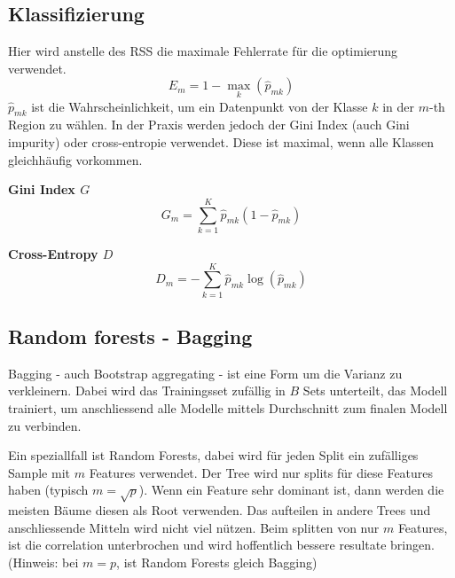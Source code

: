 \subsection{Klassifizierung}
Hier wird anstelle des RSS die maximale Fehlerrate für die optimierung verwendet.
\[
E_m = 1-\max_k(\hat{p}_{mk})
\]
$\hat{p}_{mk}$ ist die Wahrscheinlichkeit, um ein Datenpunkt von der Klasse $k$ in der $m$-th Region zu wählen. In der Praxis werden jedoch der Gini Index (auch Gini impurity) oder cross-entropie verwendet. Diese ist maximal, wenn alle Klassen gleichhäufig vorkommen.


\textbf{Gini Index $G$}
\[
G_m = \sum_{k=1}^{K}\hat{p}_{mk}(1-\hat{p}_{mk})
\]

\textbf{Cross-Entropy $D$}
\[
D_m = -\sum_{k=1}^{K}\hat{p}_{mk}\log(\hat{p}_{mk})
\]

\subsection{Random forests - Bagging}
Bagging - auch Bootstrap aggregating - ist eine Form um die Varianz zu verkleinern. Dabei wird das Trainingsset zufällig in $B$ Sets unterteilt, das Modell trainiert, um anschliessend alle Modelle mittels Durchschnitt zum finalen Modell zu verbinden.

Ein speziallfall ist Random Forests, dabei wird für jeden Split ein zufälliges Sample mit $m$ Features verwendet. Der Tree wird nur splits für diese Features haben (typisch $m=\sqrt{p}$). Wenn ein Feature sehr dominant ist, dann werden die meisten Bäume diesen als Root verwenden. Das aufteilen in andere Trees und anschliessende Mitteln wird nicht viel nützen. Beim splitten von nur $m$ Features, ist die correlation unterbrochen und wird hoffentlich bessere resultate bringen. (Hinweis: bei $m=p$, ist Random Forests gleich Bagging)